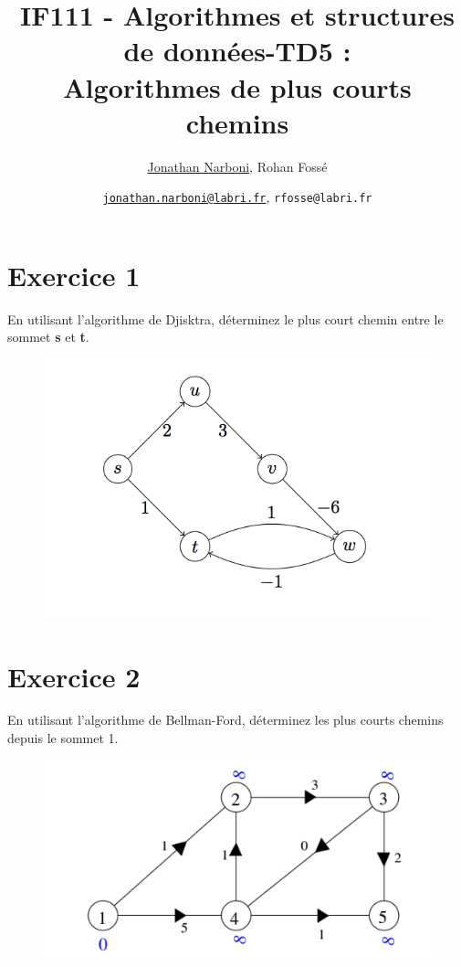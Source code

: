 \documentclass[10pt,a4paper]{article}
\title{IF111 - Algorithmes et structures de données-TD5 :\\ Algorithmes de plus courts chemins}
\date{}
\author{\underline{Jonathan Narboni}, Rohan Fossé}
\date{\underline{\texttt{jonathan.narboni@labri.fr}}, \texttt{rfosse@labri.fr}}
\begin{document}
\maketitle

\section*{Exercice 1}
En utilisant l'algorithme de Djisktra, déterminez le plus court chemin entre le sommet \textbf{s} et \textbf{t}.

\begin{figure}[h!]
    \centering
    \includegraphics[scale=0.8]{DJ-1.png}
    \label{fig:my_label}
\end{figure}



\section*{Exercice 2}
En utilisant l'algorithme de Bellman-Ford, déterminez les plus courts chemins depuis le sommet 1.

\begin{figure}[h!]
    \centering
    \includegraphics[scale=0.55]{BF-cours.png}
    \label{fig:my_label}
\end{figure}
\end{document}
